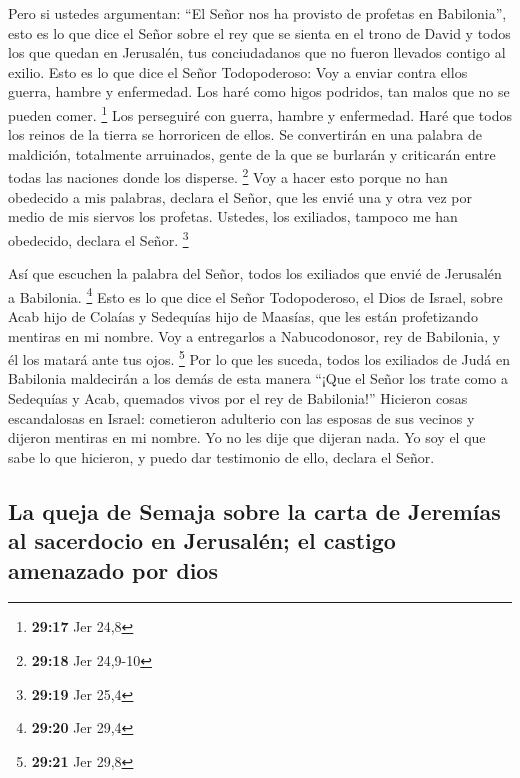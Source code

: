  Pero si ustedes argumentan: ``El Señor nos ha provisto
de profetas en Babilonia'',  esto es lo que dice el Señor
sobre el rey que se sienta en el trono de David y todos los que quedan
en Jerusalén, tus conciudadanos que no fueron llevados contigo al
exilio.  Esto es lo que dice el Señor Todopoderoso: Voy a
enviar contra ellos guerra, hambre y enfermedad. Los haré como higos
podridos, tan malos que no se pueden comer. \footnote{\textbf{29:17} Jer
  24,8}  Los perseguiré con guerra, hambre y enfermedad.
Haré que todos los reinos de la tierra se horroricen de ellos. Se
convertirán en una palabra de maldición, totalmente arruinados, gente de
la que se burlarán y criticarán entre todas las naciones donde los
disperse. \footnote{\textbf{29:18} Jer 24,9-10}  Voy a
hacer esto porque no han obedecido a mis palabras, declara el Señor, que
les envié una y otra vez por medio de mis siervos los profetas. Ustedes,
los exiliados, tampoco me han obedecido, declara el Señor. \footnote{\textbf{29:19}
  Jer 25,4}

 Así que escuchen la palabra del Señor, todos los
exiliados que envié de Jerusalén a Babilonia. \footnote{\textbf{29:20}
  Jer 29,4}  Esto es lo que dice el Señor Todopoderoso,
el Dios de Israel, sobre Acab hijo de Colaías y Sedequías hijo de
Maasías, que les están profetizando mentiras en mi nombre. Voy a
entregarlos a Nabucodonosor, rey de Babilonia, y él los matará ante tus
ojos. \footnote{\textbf{29:21} Jer 29,8}  Por lo que les
suceda, todos los exiliados de Judá en Babilonia maldecirán a los demás
de esta manera ``¡Que el Señor los trate como a Sedequías y Acab,
quemados vivos por el rey de Babilonia!''  Hicieron cosas
escandalosas en Israel: cometieron adulterio con las esposas de sus
vecinos y dijeron mentiras en mi nombre. Yo no les dije que dijeran
nada. Yo soy el que sabe lo que hicieron, y puedo dar testimonio de
ello, declara el Señor.

\hypertarget{la-queja-de-semaja-sobre-la-carta-de-jeremuxedas-al-sacerdocio-en-jerusaluxe9n-el-castigo-amenazado-por-dios}{%
\subsection{La queja de Semaja sobre la carta de Jeremías al sacerdocio
en Jerusalén; el castigo amenazado por
dios}\label{la-queja-de-semaja-sobre-la-carta-de-jeremuxedas-al-sacerdocio-en-jerusaluxe9n-el-castigo-amenazado-por-dios}}

